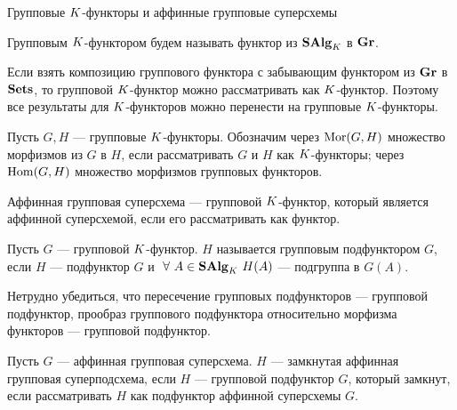 \begin{subsection}{Групповые $K$-функторы и аффинные групповые суперсхемы}
  \begin{definition}
    Групповым $K$-функтором будем называть функтор из $ \mathbf{SAlg}_K $ в $ \mathbf{Gr} $.
  \end{definition}
  Если взять композицию группового функтора с забывающим функтором из $ \mathbf{Gr} $ в $ \mathbf{Sets} $,
  то групповой $K$-функтор можно рассматривать как $K$-функтор. Поэтому все результаты
  для $K$-функторов можно перенести на групповые $K$-функторы.

  Пусть $ G, H $ --- групповые $K$-функторы. Обозначим через
  $ \mathrm{Mor}(G, H) $ множество морфизмов из $ G $ в $ H $, если рассматривать $ G $ и $ H $
  как $K$-функторы;
  через $ \mathrm{Hom}(G, H) $ множество морфизмов групповых функторов.

  \begin{definition}
    Аффинная групповая суперсхема --- групповой $K$-функтор,
    который является аффинной суперсхемой, если его рассматривать как функтор.
  \end{definition}

  \begin{definition}
    Пусть $ G $ --- групповой $K$-функтор. $ H $ называется групповым подфунктором
    $ G $, если $ H $ --- подфунктор $ G $ и $ ~\forall ~A \in \mathbf{SAlg}_K ~H(A) $ ---
    подгруппа в $ G(A) $.
  \end{definition}

  Нетрудно убедиться, что пересечение групповых подфункторов --- групповой подфунктор,
  прообраз группового подфунктора относительно морфизма функторов --- групповой подфунктор.

  \begin{definition}
    Пусть $ G $ --- аффинная групповая суперсхема. $ H $ --- замкнутая аффинная
    групповая суперподсхема, если $ H $ --- групповой подфунктор $ G $, который
    замкнут, если рассматривать $ H $ как подфунктор аффинной суперсхемы $ G $.
  \end{definition}

\end{subsection}


